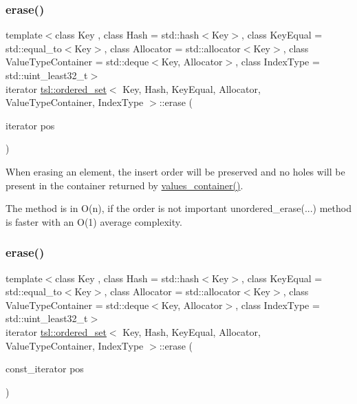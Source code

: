\subsubsection{\texorpdfstring{erase()}{erase()}\hspace{0.1cm}{\footnotesize\ttfamily [1/7]}}
{\footnotesize\ttfamily template$<$class Key , class Hash  = std\+::hash$<$\+Key$>$, class Key\+Equal  = std\+::equal\+\_\+to$<$\+Key$>$, class Allocator  = std\+::allocator$<$\+Key$>$, class Value\+Type\+Container  = std\+::deque$<$\+Key, Allocator$>$, class Index\+Type  = std\+::uint\+\_\+least32\+\_\+t$>$ \\
iterator \mbox{\hyperlink{classtsl_1_1ordered__set}{tsl\+::ordered\+\_\+set}}$<$ Key, Hash, Key\+Equal, Allocator, Value\+Type\+Container, Index\+Type $>$\+::erase (\begin{DoxyParamCaption}\item[{iterator}]{pos }\end{DoxyParamCaption})\hspace{0.3cm}{\ttfamily [inline]}}

When erasing an element, the insert order will be preserved and no holes will be present in the container returned by \textquotesingle{}\mbox{\hyperlink{classtsl_1_1ordered__set_a1bc951514a5c4c29c14b6cf5177cf1ec}{values\+\_\+container()}}\textquotesingle{}.

The method is in O(n), if the order is not important \textquotesingle{}unordered\+\_\+erase(...)\textquotesingle{} method is faster with an O(1) average complexity. \mbox{\label{classtsl_1_1ordered__set_a05c3e96aba2834dcc28b22ee8699c914}} 
\subsubsection{\texorpdfstring{erase()}{erase()}\hspace{0.1cm}{\footnotesize\ttfamily [2/7]}}
{\footnotesize\ttfamily template$<$class Key , class Hash  = std\+::hash$<$\+Key$>$, class Key\+Equal  = std\+::equal\+\_\+to$<$\+Key$>$, class Allocator  = std\+::allocator$<$\+Key$>$, class Value\+Type\+Container  = std\+::deque$<$\+Key, Allocator$>$, class Index\+Type  = std\+::uint\+\_\+least32\+\_\+t$>$ \\
iterator \mbox{\hyperlink{classtsl_1_1ordered__set}{tsl\+::ordered\+\_\+set}}$<$ Key, Hash, Key\+Equal, Allocator, Value\+Type\+Container, Index\+Type $>$\+::erase (\begin{DoxyParamCaption}\item[{const\+\_\+iterator}]{pos }\end{DoxyParamCaption})\hspace{0.3cm}{\ttfamily [inline]}}





